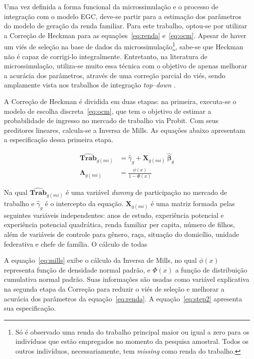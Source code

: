 Uma vez definida a forma funcional da microssimulação e o processo de integração com o modelo EGC, deve-se partir para a estimação dos parâmetros do modelo de geração da renda familiar. Para este trabalho, optou-se por utilizar a Correção de Heckman para as equações~\eqref{eq:renda} e~\eqref{eq:ocm}. Apesar de haver um viés de seleção na base de dados da microssimulação\footnote{Só é observado uma renda do trabalho principal maior ou igual a zero para os indivíduos que estão empregados no momento da pesquisa amostral. Todos os outros indivíduos, necessariamente, tem \textit{missing} como renda do trabalho.}, sabe-se que Heckman não é capaz de corrigi-lo integralmente. Entretanto, na literatura de microssimulação, utiliza-se muito essa técnica com o objetivo de apenas melhorar a acurácia dos parâmetros, através de uma correção parcial do viés, sendo amplamente vista nos trabalhos de integração \textit{top--down} \cite{bourguignon05, colombo08, cury16}.

A Correção de Heckman \cite{heckman79} é dividida em duas etapas: na primeira, executa-se o modelo de escolha discreta~\eqref{eq:ocm}, que tem o objetivo de estimar a probabilidade de ingresso no mercado de trabalho via Probit. Com seus preditores lineares, calcula-se a Inversa de Mills. As equações abaixo apresentam a especificação dessa primeira etapa.

\begin{align}
	\boldsymbol{\hat{Trab}}_{g(mi)} &= \hat{\gamma}_g + \mathbf{X}_{g(mi)} \ \boldsymbol{\hat{\beta}}_g \label{eq:step1} \\
	\boldsymbol{\Lambda}_{g(mi)}    &= \frac{\phi(x)}{1 - \Phi(x)} \label{eq:mills}
\end{align}

Na qual $\boldsymbol{\hat{Trab}}_{g(mi)}$ é uma variável \textit{dummy} de participação no mercado de trabalho e $\hat{\gamma}_g$ é o intercepto da equação. $\mathbf{X}_{g(mi)}$ é uma matriz formada pelas seguintes variáveis independentes: anos de estudo, experiência potencial e experiência potencial quadrática, renda familiar per capita, número de filhos, além de variáveis de controle para gênero, raça, situação do domicílio, unidade federativa e chefe de família. O cálculo de todas 

A equação~\eqref{eq:mills} exibe o cálculo da Inversa de Mills, no qual $\phi(x)$ representa função de densidade normal padrão, e $\Phi(x)$ a função de distribuição cumulativa normal padrão. Suas informações são usadas como variável explicativa na segunda etapa da Correção para reduzir o viés de seleção e melhorar a acurácia dos parâmetros da equação~\eqref{eq:renda}. A equação~\eqref{eq:step2} apresenta sua especificação.

